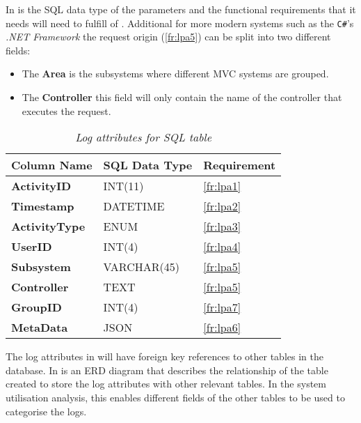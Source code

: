 In  is the SQL data type of the parameters and the functional requirements that it needs will need to fulfill of . Additional for more modern systems such as the \texttt{C\#}'s \textit{.NET Framework} the request origin (\ref{fr:lpa5}) can be split into two different fields:

\begin{itemize}
	\item The \textbf{Area} is the subsystems where different MVC systems are grouped. 
	\item The \textbf{Controller} this field will only contain the name of the controller that executes the request. 
\end{itemize}

\begin{table}[!htb]
	\centering
	\caption[Log attributes for SQL table]
	{\textit{Log attributes for SQL table}}
	\label{tbl:ch2_SQLLoggingTable}
	\begin{tabularx}{\textwidth}{|X|X|X|}
		\hline \textbf{Column Name} & \textbf{SQL Data Type} & \textbf{Requirement} \\
		\hline \textbf{ActivityID} & INT(11) & \ref{fr:lpa1} \\
		\hline \textbf{Timestamp} & DATETIME & \ref{fr:lpa2} \\
		\hline \textbf{ActivityType} & ENUM & \ref{fr:lpa3} \\
		\hline \textbf{UserID} & INT(4) & \ref{fr:lpa4} \\
		\hline \textbf{Subsystem} & VARCHAR(45) & \ref{fr:lpa5} \\
		\hline \textbf{Controller} & TEXT & \ref{fr:lpa5} \\
		\hline \textbf{GroupID} & INT(4) & \ref{fr:lpa7} \\
		\hline \textbf{MetaData} & JSON & \ref{fr:lpa6} \\
		\hline
	\end{tabularx}
\end{table}

The log attributes in  will have foreign key references to other tables in the database. In  is an ERD diagram that describes the relationship of the table created to store the log attributes with other relevant tables. In the system utilisation analysis, this enables different fields of the other tables to be used to categorise the logs.

\clearpage

